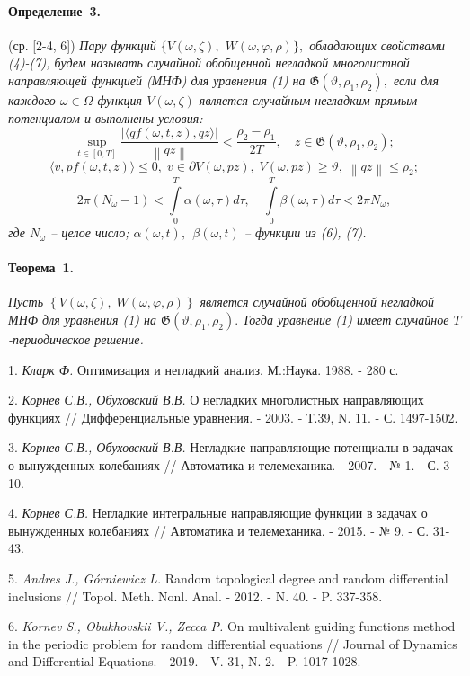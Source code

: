 \paragraph{Определение~3.} (ср. [2-4, 6])
{\it
Пару функций $\{ V(\omega,\zeta),$ \linebreak $W(\omega,\varphi,\rho ) \},$ обладающих свойствами (4)-(7),
будем называть случайной обобщенной негладкой многолистной на\-прав\-ляющей функцией (МНФ) для уравнения (1) на \linebreak $\mathfrak{G} \left({\vartheta ,\rho _{1} ,\rho _{2} } \right),$ если для каждого $\omega\in\Omega$ функция $V(\omega,\zeta)$ является случайным негладким прямым потенциалом и выполнены условия:
$$
 \mathop {\sup}\limits_{t \in \left[ {0,T} \right]}\frac{{\left| {\langle {qf(\omega, t, z),qz} \rangle} \right|}}{{\left\|{qz} \right\|}} < \frac{{\rho _{2} - \rho _{1} }}{{2T}},\quad z\in \mathfrak{G} (\vartheta ,\rho _{1} ,\rho _{2} );
$$
$$
\langle v, pf(\omega, t, z)\rangle \leq 0,\; v \in \partial V(\omega,pz),\; V(\omega,pz) \ge \vartheta ,\;\left\| {qz} \right\| \le \rho _{2};
$$
$$
2\pi (N_{\omega} - 1) < \int\limits_{0}^{T} {\alpha(\omega,\tau )d\tau } , \quad
\int\limits_{0}^{T} {\beta(\omega,\tau )d\tau < 2\pi N_{\omega}} ,
$$
где $N_{\omega}$ -- целое число; $\alpha(\omega,t),\,\;\beta(\omega,t)$ -- функции из (6), (7).
}

\paragraph{Теорема~1.}
{\it
Пусть $\left\{ {V(\omega,\zeta),\;W(\omega,\varphi,\rho )} \right\}$ является случайной обобщенной негладкой МНФ для уравнения (1) на \linebreak $\mathfrak{G} \left({\vartheta ,\rho _{1} ,\rho _{2} } \right).$   Тогда уравнение (1) имеет случайное $T$-пе\-риоди\-ческое ре\-ше\-ние.
}


\litlist

1. {\it Кларк Ф.}
Оптимизация и негладкий анализ. М.:Наука. 1988. - 280 с.

2. {\it Корнев С.В., Обуховский В.В.}
О негладких многолистных направляющих функциях // Дифференциальные уравнения. - 2003. - Т.39, N. 11. - С. 1497-1502.

3. {\it Корнев С.В., Обуховский В.В.}
Негладкие направляющие потенциалы в задачах о вынужденных колебаниях // Автоматика и телемеханика. - 2007. - № 1. - С. 3-10.

4. {\it Корнев С.В.}
Негладкие интегральные направляющие функции в задачах о вынужденных колебаниях // Автоматика и телемеханика. - 2015. - № 9. - С. 31-43.

5. {\it Andres J., G\'orniewicz L.}
Random topological degree and random differential inclusions // Topol. Meth. Nonl. Anal. - 2012. - N. 40. - P. 337-358.

6. {\it Kornev S., Obukhovskii V., Zecca P.}
On multivalent guiding functions method in the periodic problem for random differential equations // Journal of Dynamics and Differential Equations. - 2019. - V. 31, N. 2. - P. 1017-1028.
